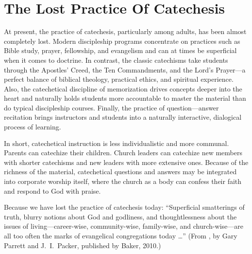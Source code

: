\documentclass[titlepage]{memoir}
\begin{document}
\section{The Lost Practice Of Catechesis}
At present, the practice of catechesis, particularly among adults, has been almost completely lost. Modern discipleship programs concentrate on practices such as Bible study, prayer, fellowship, and evangelism and can at times be superficial when it comes to doctrine. In contrast, the classic catechisms take students through the Apostles' Creed, the Ten Commandments, and the Lord's Prayer\thinspace{}---\thinspace{}a perfect balance of biblical theology, practical ethics, and spiritual experience. Also, the catechetical discipline of memorization drives concepts deeper into the heart and naturally holds students more accountable to master the material than do typical discipleship courses. Finally, the practice of question\thinspace{}---\thinspace{}answer recitation brings instructors and students into a naturally interactive, dialogical process of learning.

In short, catechetical instruction is less individualistic and more communal. Parents can catechize their children. Church leaders can catechize new members with shorter catechisms and new leaders with more extensive ones. Because of the richness of the material, catechetical questions and answers may be integrated into corporate worship itself, where the church as a body can confess their faith and respond to God with praise.

Because we have lost the practice of catechesis today: ``Superficial smatterings of truth, blurry notions about God and godliness, and thoughtlessness about the issues of living\thinspace{}---\thinspace{}career-wise, community-wise, family-wise, and church-wise\thinspace{}---\thinspace{}are all too often the marks of evangelical congregations today {\dots}'' (From , by Gary Parrett and J.~I.\ Packer, published by Baker, 2010.)
\end{document}
